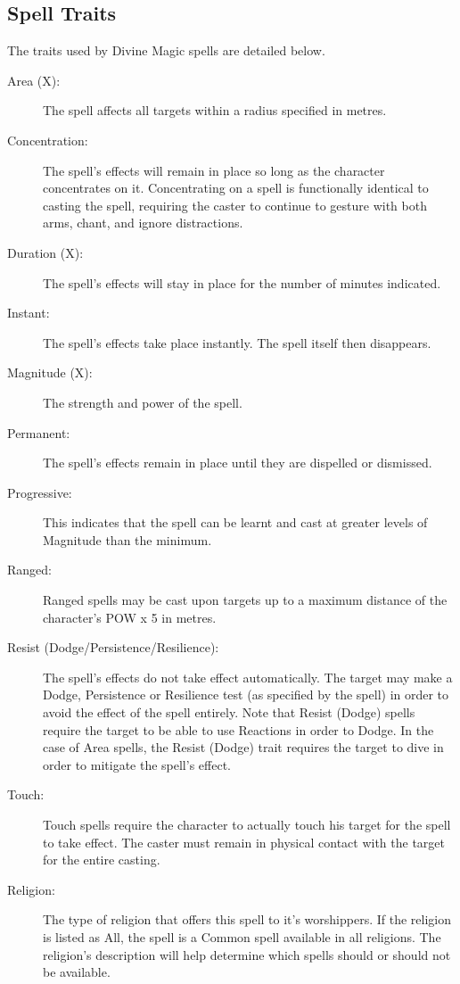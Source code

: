 \subsection{Spell Traits}
The traits used by Divine Magic spells are detailed below. 

\begin{description}
	\item[Area (X):] The spell affects all targets within a radius specified in metres.
	\item[Concentration:] The spell’s effects will remain in place so long as the character concentrates on it. Concentrating on a spell is functionally identical to casting the spell, requiring the caster to continue to gesture with both arms, chant, and ignore distractions.
	\item[Duration (X):] The spell’s effects will stay in place for the number of minutes indicated. 
	\item[Instant:] The spell’s effects take place instantly. The spell itself then disappears. 
	\item[Magnitude (X):] The strength and power of the spell.
	\item[Permanent:] The spell’s effects remain in place until they are dispelled or dismissed.
	\item[Progressive:] This indicates that the spell can be learnt and cast at greater levels of Magnitude than the minimum.
	\item[Ranged:] Ranged spells may be cast upon targets up to a maximum distance of the character’s POW x 5 in metres.
	\item[Resist (Dodge/Persistence/Resilience):] The spell’s effects do not take effect automatically. The target may make a Dodge, Persistence or Resilience test (as specified by the spell) in order to avoid the effect of the spell entirely. Note that Resist (Dodge) spells require the target to be able to use Reactions in order to Dodge. In the case of Area spells, the Resist (Dodge) trait requires the target to dive in order to mitigate the spell’s effect. 
	\item[Touch:] Touch spells require the character to actually touch his target for the spell to take effect. The caster must remain in physical contact with the target for the entire casting.
	\item[Religion:] The type of religion that offers this spell to it’s worshippers. If the religion is listed as All, the spell is a Common spell available in all religions. The religion’s description will help determine which spells should or should not be available. 
\end{description}

